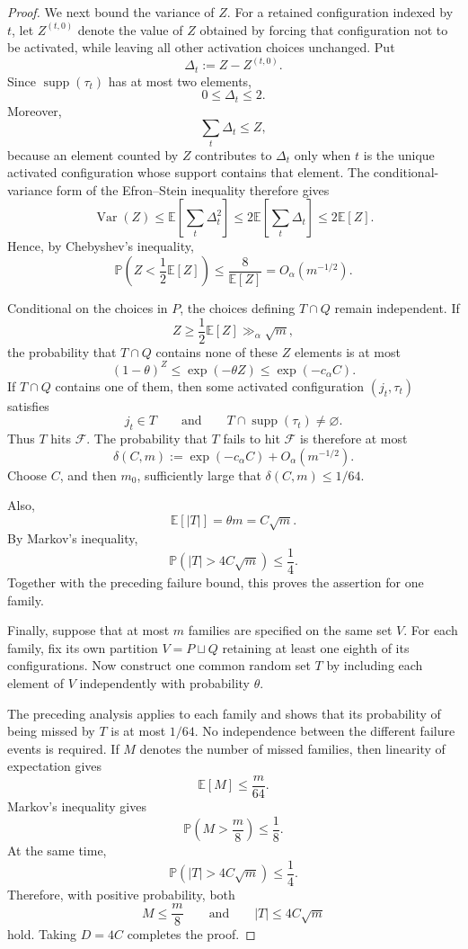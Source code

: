 \documentclass[10pt]{article}
\theoremstyle{definition}
\begin{document}
\begin{proof}
We next bound the variance of $Z$.  For a retained configuration indexed by
$t$, let $Z^{(t,0)}$ denote the value of $Z$ obtained by forcing that
configuration not to be activated, while leaving all other activation
choices unchanged.  Put
\[
    \Delta_t:=Z-Z^{(t,0)}.
\]
Since $\operatorname{supp}(\tau_t)$ has at most two elements,
\[
    0\le\Delta_t\le 2.
\]
Moreover,
\[
    \sum_t\Delta_t\le Z,
\]
because an element counted by $Z$ contributes to $\Delta_t$ only when $t$
is the unique activated configuration whose support contains that element.
The conditional-variance form of the Efron--Stein inequality therefore gives
\[
    \operatorname{Var}(Z)
      \le \mathbb E\!\left[\sum_t\Delta_t^2\right]
      \le 2\mathbb E\!\left[\sum_t\Delta_t\right]
      \le 2\mathbb E[Z].
\]
Hence, by Chebyshev's inequality,
\[
    \mathbb P\!\left(Z<\frac12\mathbb E[Z]\right)
      \le \frac{8}{\mathbb E[Z]}
      =O_\alpha(m^{-1/2}).
\]

Conditional on the choices in $P$, the choices defining $T\cap Q$ remain
independent.  If
\[
    Z\ge\frac12\mathbb E[Z]\gg_\alpha\sqrt m,
\]
the probability that $T\cap Q$ contains none of these $Z$ elements is at
most
\[
    (1-\theta)^Z
      \le \exp(-\theta Z)
      \le \exp(-c_\alpha C).
\]
If $T\cap Q$ contains one of them, then some activated configuration
$(j_t,\tau_t)$ satisfies
\[
    j_t\in T
    \qquad\text{and}\qquad
    T\cap\operatorname{supp}(\tau_t)\ne\varnothing.
\]
Thus $T$ hits $\mathcal F$.  The probability that $T$ fails to hit
$\mathcal F$ is therefore at most
\[
    \delta(C,m):=\exp(-c_\alpha C)+O_\alpha(m^{-1/2}).
\]
Choose $C$, and then $m_0$, sufficiently large that
$\delta(C,m)\le 1/64$.

Also,
\[
    \mathbb E[|T|]=\theta m=C\sqrt m.
\]
By Markov's inequality,
\[
    \mathbb P(|T|>4C\sqrt m)\le\frac14.
\]
Together with the preceding failure bound, this proves the assertion for
one family.

Finally, suppose that at most $m$ families are specified on the same set
$V$.  For each family, fix its own partition $V=P\sqcup Q$ retaining at
least one eighth of its configurations.  Now construct one common random
set $T$ by including each element of $V$ independently with probability
$\theta$.

The preceding analysis applies to each family and shows that its probability
of being missed by $T$ is at most $1/64$.  No independence between the
different failure events is required.  If $M$ denotes the number of missed
families, then linearity of expectation gives
\[
    \mathbb E[M]\le\frac m{64}.
\]
Markov's inequality gives
\[
    \mathbb P\!\left(M>\frac m8\right)\le\frac18.
\]
At the same time,
\[
    \mathbb P(|T|>4C\sqrt m)\le\frac14.
\]
Therefore, with positive probability, both
\[
    M\le\frac m8
    \qquad\text{and}\qquad
    |T|\le 4C\sqrt m
\]
hold.  Taking $D=4C$ completes the proof.
\end{proof}
\end{document}
